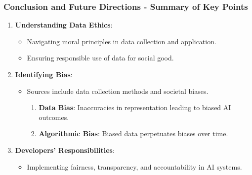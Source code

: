 \documentclass[aspectratio=169]{beamer}
\begin{document}
\begin{frame}[fragile]
  \frametitle{Conclusion and Future Directions - Summary of Key Points}
  
  \begin{enumerate}
      \item \textbf{Understanding Data Ethics}: 
      \begin{itemize}
          \item Navigating moral principles in data collection and application.
          \item Ensuring responsible use of data for social good.
      \end{itemize}
      
      \item \textbf{Identifying Bias}: 
      \begin{itemize}
          \item Sources include data collection methods and societal biases.
          \begin{enumerate}
              \item \textbf{Data Bias}: Inaccuracies in representation leading to biased AI outcomes.
              \item \textbf{Algorithmic Bias}: Biased data perpetuates biases over time.
          \end{enumerate}
      \end{itemize}

      \item \textbf{Developers' Responsibilities}:
      \begin{itemize}
          \item Implementing fairness, transparency, and accountability in AI systems.
      \end{itemize}
  \end{enumerate}
\end{frame}
\end{document}
